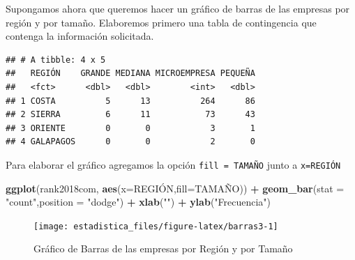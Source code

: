 \documentclass[]{book}
\newenvironment{Shaded}{\begin{snugshade}}{\end{snugshade}}
\newcommand{\DataTypeTok}[1]{\textcolor[rgb]{0.13,0.29,0.53}{#1}}
\newcommand{\DecValTok}[1]{\textcolor[rgb]{0.00,0.00,0.81}{#1}}
\newcommand{\KeywordTok}[1]{\textcolor[rgb]{0.13,0.29,0.53}{\textbf{#1}}}
\newcommand{\NormalTok}[1]{#1}
\newcommand{\OperatorTok}[1]{\textcolor[rgb]{0.81,0.36,0.00}{\textbf{#1}}}
\newcommand{\StringTok}[1]{\textcolor[rgb]{0.31,0.60,0.02}{#1}}
\begin{document}
Supongamos ahora que queremos hacer un gráfico de barras de las empresas por región y por tamaño. Elaboremos primero una tabla de contingencia que contenga la información solicitada.

\begin{Shaded}
\end{Shaded}

\begin{verbatim}
## # A tibble: 4 x 5
##   REGIÓN    GRANDE MEDIANA MICROEMPRESA PEQUEÑA
##   <fct>      <dbl>   <dbl>        <int>   <dbl>
## 1 COSTA          5      13          264      86
## 2 SIERRA         6      11           73      43
## 3 ORIENTE        0       0            3       1
## 4 GALAPAGOS      0       0            2       0
\end{verbatim}

Para elaborar el gráfico agregamos la opción \texttt{fill\ =\ TAMAÑO} junto a \texttt{x=REGIÓN}

\begin{Shaded}
\begin{Highlighting}[]
\KeywordTok{ggplot}\NormalTok{(rank2018com, }\KeywordTok{aes}\NormalTok{(}\DataTypeTok{x=}\NormalTok{REGIÓN,}\DataTypeTok{fill=}\NormalTok{TAMAÑO)) }\OperatorTok{+}\StringTok{ }
\StringTok{  }\KeywordTok{geom_bar}\NormalTok{(}\DataTypeTok{stat =} \StringTok{"count"}\NormalTok{,}\DataTypeTok{position =} \StringTok{"dodge"}\NormalTok{) }\OperatorTok{+}
\StringTok{  }\KeywordTok{xlab}\NormalTok{(}\StringTok{""}\NormalTok{) }\OperatorTok{+}\StringTok{ }\KeywordTok{ylab}\NormalTok{(}\StringTok{"Frecuencia"}\NormalTok{)}
\end{Highlighting}
\end{Shaded}

\begin{figure}[h!]

{\centering \texttt{[image: estadistica\_files/figure-latex/barras3-1]} 

}

\caption{Gráfico de Barras de las empresas por Región y por Tamaño}\label{fig:barras3}
\end{figure}
\end{document}
